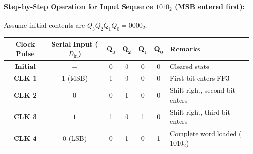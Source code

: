 \documentclass[11pt,a4paper,oneside]{book}
\begin{document}
\paragraph{Step-by-Step Operation for Input Sequence $1010_2$ (MSB entered first):}
Assume initial contents are $Q_3 Q_2 Q_1 Q_0 = 0000_2$.
\begin{center}
\begin{tabular}{|c|c|cccc|l|}
\hline
\textbf{Clock Pulse} & \textbf{Serial Input ($D_{\text{in}}$)} & $\mathbf{Q_3}$ & $\mathbf{Q_2}$ & $\mathbf{Q_1}$ & $\mathbf{Q_0}$ & \textbf{Remarks} \\ \hline
\textbf{Initial} & $-$ & 0 & 0 & 0 & 0 & Cleared state \\ \hline
\textbf{CLK 1} & $1$ (MSB) & 1 & 0 & 0 & 0 & First bit enters FF3 \\ \hline
\textbf{CLK 2} & $0$ & 0 & 1 & 0 & 0 & Shift right, second bit enters \\ \hline
\textbf{CLK 3} & $1$ & 1 & 0 & 1 & 0 & Shift right, third bit enters \\ \hline
\textbf{CLK 4} & $0$ (LSB) & 0 & 1 & 0 & 1 & Complete word loaded ($1010_2$) \\ \hline
\end{tabular}
\end{center}
\end{document}
